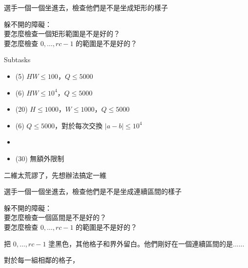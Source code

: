 \begin{frame}{}
    選手一個一個坐進去，檢查他們是不是坐成矩形的樣子

    躲不開的障礙：\\
    要怎麼檢查一個矩形範圍是不是好的？\\
    要怎麼檢查 $0, \dots, rc - 1$ 的範圍是不是好的？
\end{frame}

\begin{frame}{}
    \begin{problem}
        Subtasks

        \begin{itemize}
            \item (5) $HW \le 100$，$Q \le 5000$
            \item (6) $HW \le 10^4$，$Q \le 5000$
            \item (20) $H \le 1000$，$W \le 1000$，$Q \le 5000$
            \item (6) $Q \le 5000$，對於每次交換 $|a - b| \le 10^4$
            \item {}
            \item (30) 無額外限制
        \end{itemize}
    \end{problem}

    二維太荒謬了，先想辦法搞定一維

\end{frame}

\begin{frame}{}
    選手一個一個坐進去，檢查他們是不是坐成連續區間的樣子

    躲不開的障礙：\\
    要怎麼檢查一個區間是不是好的？\\
    要怎麼檢查 $0, \dots, rc - 1$ 的範圍是不是好的？
\end{frame}

\begin{frame}{}
    \todo
\end{frame}

\begin{frame}{}
    把 $0, \dots, rc - 1$ 塗黑色，其他格子和界外留白。他們剛好在一個連續區間的是......

     {
        對於每一組相鄰的格子， \\
    }
\end{frame}

